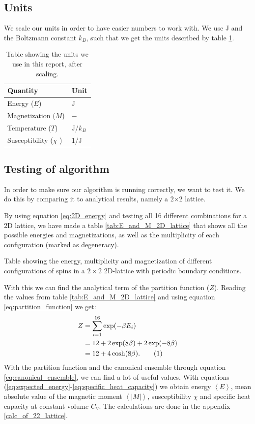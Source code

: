 \documentclass[reprint, english,notitlepage,nofootinbib]{revtex4-1}  %
\newcommand\numberthis{\addtocounter{equation}{1}\tag{\theequation}}
\begin{document}
\subsection{Units}

We scale our units in order to have easier numbers to work with. We use J and the Boltzmann constant $k_B$, such that we get the units described by table \ref{tab:units}.

\begin{table}[h]
	\begin{tabular}{||l|l||}
		\hline
		Quantity             & Unit   \\
		\hline
		Energy ($E$)              & J      \\
		\hline
		Magnetization ($M$)        & $-$      \\
		\hline
		Temperature ($T$)        & J/$k_B$ \\
		\hline
		Susceptibility ($\chi$ ) & 1/J   \\
		\hline
	\end{tabular}
	\caption{Table showing the units we use in this report, after scaling.}
	\label{tab:units}
\end{table}

\subsection{Testing of algorithm}

In order to make sure our algorithm is running correctly, we want to test it. We do this by comparing it to analytical results, namely a 2$\times$2 lattice.

By using equation \eqref{eq:2D_energy} and testing all 16 different combinations for a 2D lattice, we have made a table \ref{tab:E_and_M_2D_lattice} that shows all the possible energies and magnetizations, as well as the multiplicity of each configuration (marked as degeneracy).
\begin{table}[h]
	
	\caption{Table showing the energy, multiplicity and magnetization of different configurations of spins in a $2 \times 2$ 2D-lattice with periodic boundary conditions.}
	\label{tab:E_and_M_2D_lattice}
\end{table}
With this we can find the analytical term of the partition function ($Z$). Reading the values from table \ref{tab:E_and_M_2D_lattice} and using equation \eqref{eq:partition_function} we get:
\begin{align*}
Z &= \sum_{i = 1}^{16} \exp(-\beta E_i) \\
&= 12 + 2\exp(8\beta) + 2\exp(-8\beta) \\
&= 12 + 4\cosh(8\beta). \numberthis \label{eq:2Dpartition_function}
\end{align*}
With the partition function and the canonical ensemble through equation \eqref{eq:canonical_ensemble}, we can find a lot of useful values. With equations (\ref{eq:expected_energy}-\ref{eq:specific_heat_capacity}) we obtain energy $\left<E\right	>$, mean absolute value of the magnetic moment $\left<|M|\right>$, susceptibility $\chi$ and specific heat capacity at constant volume $C_V$. The calculations are done in the appendix \ref{calc_of_22_lattice}.
\end{document}
